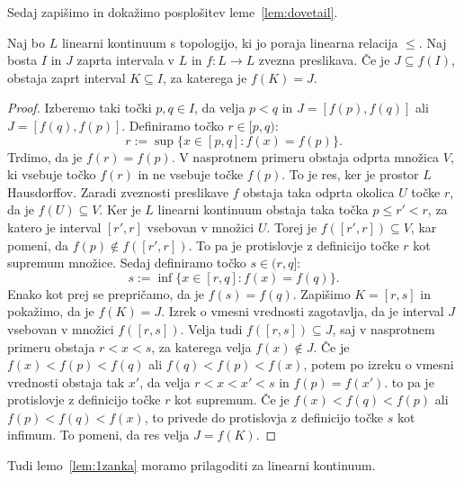 \documentclass[../TG_magistrsko_delo_sections.tex]{subfiles}
\begin{document}
Sedaj zapišimo in dokažimo posplošitev leme~\ref{lem:dovetail}.

\begin{lema}\label{lem:K}
Naj bo $L$ linearni kontinuum s topologijo, ki jo poraja linearna relacija $\leq$. Naj bosta $I$ in $J$ zaprta intervala v $L$ in $f:L \to L$ zvezna preslikava. Če je $J \subseteq f(I)$, obstaja zaprt interval $K \subseteq I$, za katerega je $f(K) = J$.
\end{lema}
\begin{proof}
Izberemo taki točki $p, q \in I$, da velja $p<q$ in $J=[f(p), f(q)]$ ali $J=[f(q), f(p)]$. Definiramo točko $r \in [p, q)$:
$$r:= \sup\{x \in [p, q] : f(x) = f(p)\}.$$
Trdimo, da je $f(r) = f(p)$. V nasprotnem primeru obstaja odprta množica $V$, ki vsebuje točko $f(r)$ in ne vsebuje točke $f(p)$. To je res, ker je prostor $L$ Hausdorffov. Zaradi zveznosti preslikave $f$ obstaja taka odprta okolica $U$ točke $r$, da je $f(U) \subseteq V$. Ker je $L$ linearni kontinuum obstaja taka točka $p \leq r' < r$, za katero je interval $[r', r]$ vsebovan v množici $U$. Torej je $f([r', r]) \subseteq V$, kar pomeni, da $f(p) \notin f([r', r])$. To pa je protislovje z definicijo točke $r$ kot supremum množice.
Sedaj definiramo točko $s \in (r, q]$:
$$s:= \inf\{x \in [r, q] : f(x) = f(q)\}.$$ 
Enako kot prej se prepričamo, da je $f(s) = f(q)$. Zapišimo $K = [r, s]$ in pokažimo, da je $f(K) = J$. Izrek o vmesni vrednosti zagotavlja, da je interval $J$ vsebovan v množici $f([r, s])$. Velja tudi $f([r, s]) \subseteq J$, saj v nasprotnem primeru obstaja $r<x<s$, za katerega velja $f(x) \notin J$. Če je $f(x) < f(p) < f(q)$ ali $f(q) < f(p) < f(x)$, potem po izreku o vmesni vrednosti obstaja tak $x'$, da velja $r<x<x'<s$ in $f(p) = f(x')$. to pa je protislovje z definicijo točke $r$ kot supremum. Če je $f(x) < f(q) < f(p)$ ali $f(p) < f(q) < f(x)$, to privede do protislovja z definicijo točke $s$ kot infimum. To pomeni, da res velja $J = f(K)$.
\end{proof}

Tudi lemo~\ref{lem:1zanka} moramo prilagoditi za linearni kontinuum.
\end{document}
